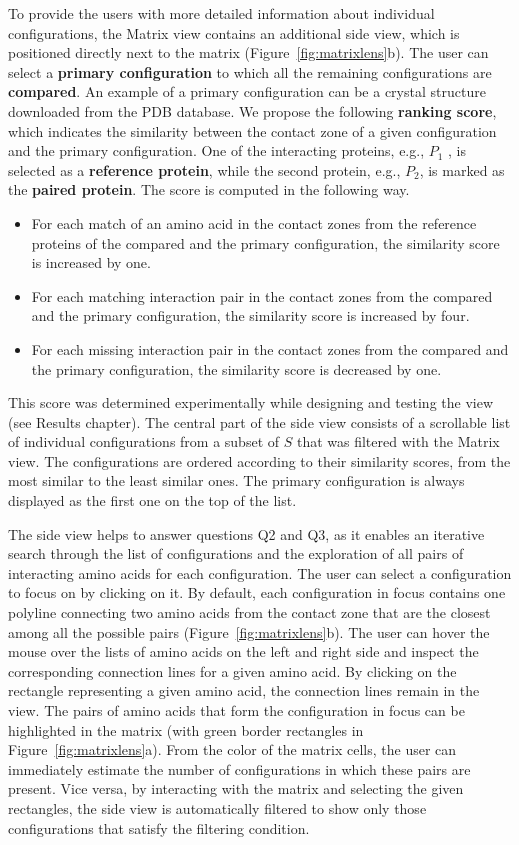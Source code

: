 \documentclass[twocolumn]{bmcart}%
\def\MatView {Matrix view\xspace}
\begin{document}
To provide the users with more detailed information about individual configurations, the \MatView contains an additional side view, which is positioned directly next to the matrix (Figure~\ref{fig:matrixlens}b).
The user can select a \textbf{primary configuration} to which all the remaining configurations are \textbf{compared}.
An example of a primary configuration can be a crystal structure downloaded from the PDB database.
We propose the following \textbf{ranking score}, which indicates the similarity between the contact zone of a given configuration and the primary configuration.
One of the interacting proteins, e.g., $P_1$ , is selected as a \textbf{reference protein}, while the second protein, e.g., $P_2$, is marked as the \textbf{paired protein}.
The score is computed in the following way.
\begin{itemize}
\item For each match of an amino acid in the contact zones from the reference proteins of the compared and the primary configuration, the similarity score is increased by one.
\item For each matching interaction pair in the contact zones from the compared and the primary configuration, the similarity score is increased by four.
\item For each missing interaction pair in the contact zones from the compared and the primary configuration, the similarity score is decreased by one.
\end{itemize}
This score was determined experimentally while designing and testing the view (see Results chapter). 
The central part of the side view consists of a scrollable list of individual configurations from a subset of $S$ that was filtered with the \MatView.
The configurations are ordered according to their similarity scores, from the most similar to the least similar ones.
The primary configuration is always displayed as the first one on the top of the list.

The side view helps to answer questions Q2 and Q3, as it enables an iterative search through the list of configurations and the exploration of all pairs of interacting amino acids for each configuration.
The user can select a configuration to focus on by clicking on it. 
By default, each configuration in focus contains one polyline connecting two amino acids from the contact zone that are the closest among all the possible pairs (Figure~\ref{fig:matrixlens}b).
The user can hover the mouse over the lists of amino acids on the left and right side and inspect the corresponding connection lines for a given amino acid.
By clicking on the rectangle representing a given amino acid, the connection lines remain in the view. 
The pairs of amino acids that form the configuration in focus can be highlighted in the matrix (with green border rectangles in Figure~\ref{fig:matrixlens}a).
From the color of the matrix cells, the user can immediately estimate the number of configurations in which these pairs are present.
Vice versa, by interacting with the matrix and selecting the given rectangles, the side view is automatically filtered to show only those configurations that satisfy the filtering condition.
\end{document}
